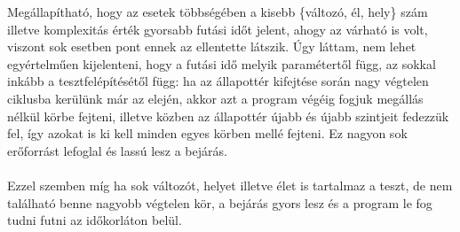 Megállapítható, hogy az esetek többségében a kisebb  \{változó, él, hely\} szám illetve komplexitás érték gyorsabb futási időt jelent, ahogy az várható is volt, viszont sok esetben pont ennek az ellentette látszik. Úgy láttam, nem lehet egyértelműen kijelenteni, hogy a futási idő melyik paramétertől függ, az sokkal inkább a tesztfelépítésétől függ: ha az állapottér kifejtése során nagy végtelen ciklusba kerülünk már az elején, akkor azt a program végéig fogjuk megállás nélkül körbe fejteni, illetve közben az állapottér újabb és újabb szintjeit fedezzük fel, így azokat is ki kell minden egyes körben mellé fejteni. Ez nagyon sok erőforrást lefoglal és lassú lesz a bejárás.
\\
\\
Ezzel szemben míg ha sok változót, helyet illetve élet is tartalmaz a teszt, de nem található benne nagyobb végtelen kör, a bejárás gyors lesz és a program le fog tudni futni az időkorláton belül.